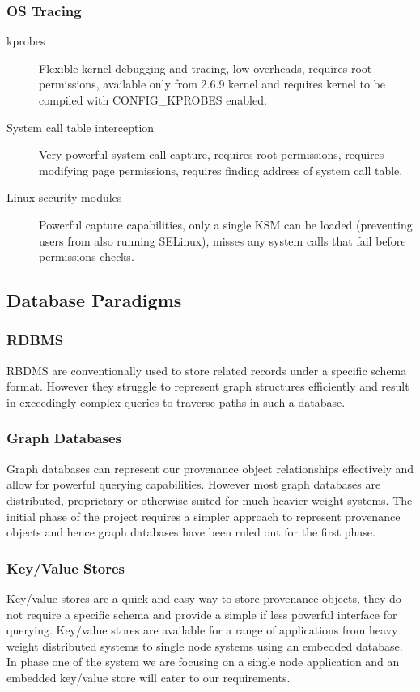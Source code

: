 \subsubsection{OS Tracing}
\begin{description}
\item[kprobes] Flexible kernel debugging and tracing, low overheads, requires root permissions, available only from 2.6.9 kernel and requires kernel to be compiled with CONFIG\_KPROBES enabled.
\item[System call table interception] Very powerful system call capture, requires root permissions, requires modifying page permissions, requires finding address of system call table.
\item[Linux security modules] Powerful capture capabilities, only a single KSM can be loaded (preventing users from also running SELinux), misses any system calls that fail before permissions checks.
\end{description}

\subsection{Database Paradigms}

\subsubsection{RDBMS}
RBDMS are conventionally used to store related records under a specific schema format. However they struggle to represent graph structures efficiently and result in exceedingly complex queries to traverse paths in such a database.

\subsubsection{Graph Databases}
Graph databases can represent our provenance object relationships effectively and allow for powerful querying capabilities. However most graph databases are distributed, proprietary or otherwise suited for much heavier weight systems. The initial phase of the project requires a simpler approach to represent provenance objects and hence graph databases have been ruled out for the first phase.

\subsubsection{Key/Value Stores}
Key/value stores are a quick and easy way to store provenance objects, they do not require a specific schema and provide a simple if less powerful interface for querying. Key/value stores are available for a range of applications from heavy weight distributed systems to single node systems using an embedded database. In phase one of the system we are focusing on a single node application and an embedded key/value store will cater to our requirements.

